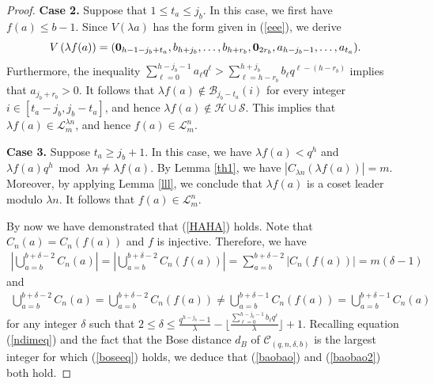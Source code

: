 \documentclass[journal,onecolumn]{IEEEtran}
\begin{document}
\begin{proof}
\textbf{Case 2.} Suppose that $1\leq t_a\leq  j_b$. In this case, we first have 
$f(a)\leq b-1$. 
Since $V(\lambda a )$ has the form given in (\ref{eee}),  we derive    
\begin{equation}\notag
    V\left( \lambda f(a) \right) = (\mathbf{0}_{h-1-j_b+t_a}, b_{h+j_b}, \ldots, b_{h+r_b}, \mathbf{0}_{2r_{b}},a_{h-j_b-1},\ldots,a_{t_a}). 
\end{equation}
Furthermore, the inequality $\sum\limits_{\ell=0}^{h-j_b-1}a_{\ell}q^{\ell}>\sum\limits_{\ell=h-r_{b}}^{h+j_{b}}b_{\ell}q^{\ell-(h-r_{b})}$ implies that $a_{j_b+r_b}>0$.  It follows that 
  $\lambda f(a) \not \in \mathcal{B}_{j_b-t_a}(i)$ for every integer $i\in [t_a-j_b, j_b-t_a]$, and hence  $\lambda f(a) \not \in \mathcal{H}\cup \mathcal{S}$. This implies that  $\lambda f(a) \in \mathcal{L}^{\lambda n}_m$, and hence    $f(a)\in \mathcal{L}^n_m$. 

\textbf{Case 3.}
Suppose   $t_a\geq j_b+1$. In this case, we have  $\lambda f(a)<q^h$ and 
$\lambda f(a) q^h \bmod \lambda n \neq \lambda f(a)$. By Lemma \ref{th1}, we have $|C_{\lambda n}(\lambda f(a))|=m$. Moreover, 
by applying Lemma \ref{lll}, we  conclude that $\lambda f(a)$ is a coset leader modulo $\lambda  n$. It follows  that $f(a)\in \mathcal{L}^n_m$.  


By now we have demonstrated that (\ref{HAHA}) holds. Note that $C_n(a)=C_n(f(a))$ and   $f$ is injective.  Therefore, we have 
\begin{equation*}
\begin{split}
   \left|\bigcup\limits_{a=b}^{b+\delta-2}C_n(a) \right|=  \left|\bigcup\limits_{a=b}^{b+\delta-2}C_n(f(a))\right|=\sum\limits_{a=b}^{b+\delta-2} |C_n(f(a))|=m(\delta-1) 
   \end{split}
\end{equation*} 
and 
\begin{equation*}
\begin{split}
   \bigcup\limits_{a=b}^{b+\delta-2}C_n(a)  =  \bigcup\limits_{a=b}^{b+\delta-2}C_n(f(a)) \neq \bigcup\limits_{a=b}^{b+\delta-1}C_n(f(a)) =  \bigcup\limits_{a=b}^{b+\delta-1}C_n(a)
   \end{split}
\end{equation*}
for any integer $\delta$ such that  $2\leq \delta \leq \frac{q^{h-j_b}-1}{\lambda}-\lfloor \frac{\sum\limits_{\ell=0}^{h-j_{b}-1}b_{\ell}q^{\ell}}{\lambda}\rfloor +1$.
Recalling equation  (\ref{ndimeq}) and the fact that the Bose distance $d_B$ of $\mathcal{C}_{(q,n,\delta,b)}$ is the largest integer for which (\ref{boseeq}) holds, we deduce that (\ref{baobao}) and (\ref{baobao2}) both hold. 
\end{proof}
\end{document}
